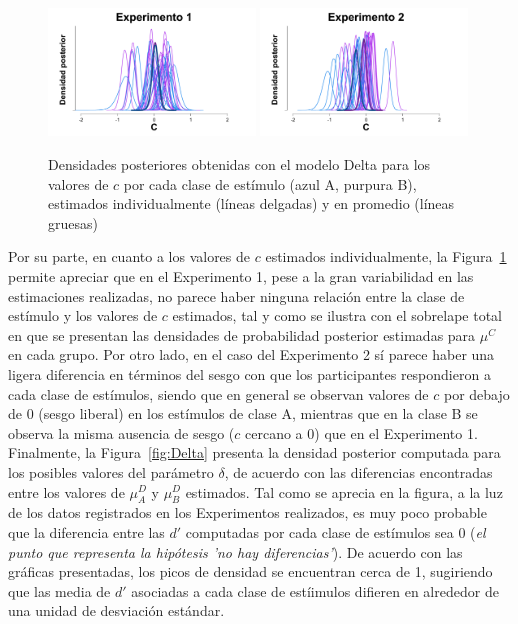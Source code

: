 \begin{figure}[h]
\centering
\includegraphics[width=0.49\textwidth]{Figures/MDelta_Cbias_E1}
 \includegraphics[width=0.49\textwidth]{Figures/MDelta_Cbias_E2}\\
\decoRule
\caption[Modelo Delta: Densidades posteriores de los valores de $c$ estimados individualmente y en promedio, por cada experimento]{Densidades posteriores obtenidas con el modelo Delta para los valores de $c$ por cada clase de estímulo (azul A, purpura B), estimados individualmente (líneas delgadas) y en promedio (líneas gruesas)}
\label{fig:Delta_Cbias}
\end{figure}


Por su parte, en cuanto a los valores de $c$ estimados individualmente, la Figura~\ref{fig:Delta_Cbias} permite apreciar que en el Experimento 1, pese a la gran variabilidad en las estimaciones realizadas, no parece haber ninguna relación entre la clase de estímulo y los valores de $c$ estimados, tal y como se ilustra con el sobrelape total en que se presentan las densidades de probabilidad posterior estimadas para $\mu^C$ en cada grupo. Por otro lado, en el caso del Experimento 2 sí parece haber una ligera diferencia en términos del sesgo con que los participantes respondieron a cada clase de estímulos, siendo que en general se observan valores de $c$ por debajo de 0 (sesgo liberal) en los estímulos de clase A, mientras que en la clase B se observa la misma ausencia de sesgo ($c$ cercano a $0$) que en el Experimento 1.\\

Finalmente, la Figura~\ref{fig:Delta} presenta la densidad posterior computada para los posibles valores del parámetro $\delta$, de acuerdo con las diferencias encontradas entre los valores de $\mu^D_A$ y $\mu^D_B$ estimados. Tal como se aprecia en la figura, a la luz de los datos registrados en los Experimentos realizados, es muy poco probable que la diferencia entre las $d'$ computadas por cada clase de estímulos sea 0 (\textit{el punto que representa la hipótesis 'no hay diferencias'}). De acuerdo con las gráficas presentadas, los picos de densidad se encuentran cerca de 1, sugiriendo que las media de $d'$ asociadas a cada clase de estíimulos difieren en alrededor de una unidad de desviación estándar.\\

